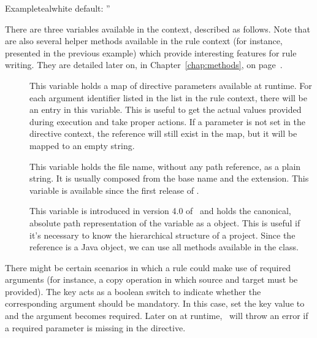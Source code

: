 \begin{description}
\begin{description}
\begin{codebox}{Example}{teal}{\icnote}{white}
default: ''
\end{codebox}

There are three variables available in the  context, described as follows. Note that are also several helper methods available in the rule context (for instance,  presented in the previous example) which provide interesting features for rule writing. They are detailed later on, in Chapter~\ref{chap:methods}, on page~\pageref{chap:methods}.

\begin{description}
\item[] This variable holds a map of directive parameters available at runtime. For each argument identifier listed in the  list in the rule context, there will be an entry in this variable. This is useful to get the actual values provided during execution and take proper actions. If a parameter is not set in the directive context, the reference will still exist in the map, but it will be mapped to an empty string.

\item[] This variable holds the file name, without any path reference, as a plain string. It is usually composed from the base name and the extension. This variable is available since the first release of \arara.

\item[] This variable is introduced in version 4.0 of \arara\ and holds the canonical, absolute path representation of the  variable as a  object. This is useful if it's necessary to know the hierarchical structure of a project. Since the reference is a Java object, we can use all methods available in the  class.
\end{description}

\item[\describecontext{O}{arguments}{required}] There might be certain scenarios in which a rule could make use of required arguments (for instance, a copy operation in which source and target must be provided). The  key acts as a boolean switch to indicate whether the corresponding argument should be mandatory. In this case, set the key value to  and the argument becomes required. Later on at runtime, \arara\ will throw an error if a required parameter is missing in the directive.


\end{description}
\end{description}
